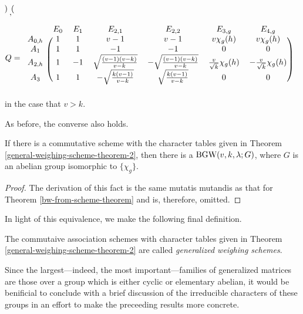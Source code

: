 \documentclass[../../../main]{subfiles}
\begin{document}
\begin{thm}
\begin{align*}
\begin{blockarray}{ccccc}
\begin{block}{c(cccc)}
   \end{block}
  \end{blockarray}, \\
  Q &= 
  \begin{blockarray}{ccccccc}
   & E_0 & E_1 & E_{2,1} & E_{2,2} & E_{3,g} & E_{4,g} \\
   \begin{block}{c(cccccc)}
    A_{0,h} & 1 & 1 & v-1 & v-1 & v\chi_g(h) & v\chi_g(h) \\
    A_1 & 1 & 1 & -1 & -1 & 0 & 0 \\
    A_{2,h} & 1 & -1 & \sqrt{\frac{(v-1)(v-k)}{v-k}} & -\sqrt{\frac{(v-1)(v-k)}{v-k}} & \frac{v}{\sqrt{k}}\chi_g(h) & -\frac{v}{\sqrt{k}}\chi_g(h) \\
    A_3 & 1 & 1 & -\sqrt{\frac{k(v-1)}{v-k}} & \sqrt{\frac{k(v-1)}{v-k}} & 0 & 0 \\
   \end{block}
  \end{blockarray}
 \end{align*}
 in the case that $v>k$.
\end{thm}

As before, the converse also holds.

\begin{thm}
 If there is a commutative scheme with the character tables given in Theorem \ref{general-weighing-scheme-theorem-2}, then there is a $\text{BGW}(v,k,\lambda; G)$, where $G$ is an abelian group isomorphic to $\{\chi_g\}$.
\end{thm}

\begin{proof}
 The derivation of this fact is the same mutatis mutandis as that for Theorem \ref{bw-from-scheme-theorem} and is, therefore, omitted.
\end{proof}

In light of this equivalence, we make the following final definition.

\begin{defin}
 The commutaive association schemes with character tables given in Theorem \ref{general-weighing-scheme-theorem-2} are called {\it generalized weighing schemes}.
\end{defin}

Since the largest---indeed, the most important---families of generalized matrices are those over a group which is either cyclic or elementary abelian, it would be benificial to conclude with a brief discussion of the irreducible characters of these groups in an effort to make the preceeding results more concrete. 
\end{document}

